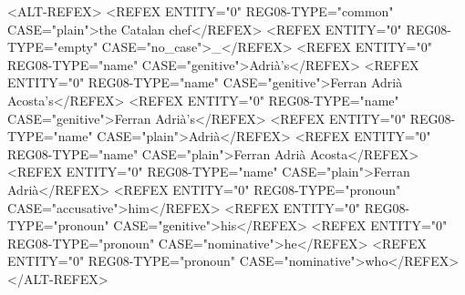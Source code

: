 <ALT-REFEX>
    <REFEX ENTITY="0" REG08-TYPE="common" CASE="plain">the Catalan chef</REFEX>
    <REFEX ENTITY="0" REG08-TYPE="empty" CASE="no_case">_</REFEX>
    <REFEX ENTITY="0" REG08-TYPE="name" CASE="genitive">Adrià's</REFEX>
    <REFEX ENTITY="0" REG08-TYPE="name" CASE="genitive">Ferran Adrià Acosta's</REFEX>
    <REFEX ENTITY="0" REG08-TYPE="name" CASE="genitive">Ferran Adrià's</REFEX>
    <REFEX ENTITY="0" REG08-TYPE="name" CASE="plain">Adrià</REFEX>
    <REFEX ENTITY="0" REG08-TYPE="name" CASE="plain">Ferran Adrià Acosta</REFEX>
    <REFEX ENTITY="0" REG08-TYPE="name" CASE="plain">Ferran Adrià</REFEX>
    <REFEX ENTITY="0" REG08-TYPE="pronoun" CASE="accusative">him</REFEX>
    <REFEX ENTITY="0" REG08-TYPE="pronoun" CASE="genitive">his</REFEX>
    <REFEX ENTITY="0" REG08-TYPE="pronoun" CASE="nominative">he</REFEX>
    <REFEX ENTITY="0" REG08-TYPE="pronoun" CASE="nominative">who</REFEX>
</ALT-REFEX>